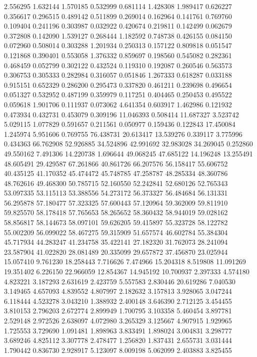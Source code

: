 2.556295
1.632144
1.570185
0.532999
0.681114
1.428308
1.989417
0.626227
0.356617
0.296515
0.489142
0.511899
0.269014
0.162964
0.141761
0.769760
0.109404
0.241196
0.303987
0.032922
0.420674
0.219811
0.142499
0.062679
0.372808
0.142090
1.539127
0.268444
1.182592
0.748738
0.426155
0.084150
0.072960
0.508014
0.303288
1.201934
0.250313
0.157122
0.809818
0.051547
0.121868
0.390401
0.553058
1.376332
0.859697
0.198560
0.545082
0.282361
0.468459
0.052799
0.302122
0.432524
0.119310
0.192087
0.260546
0.563573
0.306753
0.305333
0.282984
0.316057
0.051846
1.267333
0.618287
0.033188
0.915151
0.652329
0.286200
0.295473
0.337820
0.461211
0.239698
0.496654
0.051327
0.532952
0.487199
0.359979
0.117251
0.404465
0.250453
0.495522
0.059618
1.901706
0.111937
0.073062
4.641354
0.603917
1.462986
0.121932
0.473934
0.432731
0.453079
0.309196
11.046393
0.508414
11.687327
3.523742
5.029115
1.077829
0.591657
0.211561
0.050977
0.159436
0.122843
17.450084
1.245974
5.951606
0.769755
76.438731
20.613417
13.539276
0.339117
3.775996
0.434363
66.762908
52.926885
34.524896
42.991692
32.983028
34.269045
0.252860
49.550162
7.491306
14.220738
1.696644
49.068245
47.685122
14.196248
13.255491
48.605491
29.429587
67.261866
40.861726
66.207576
56.158417
55.606752
40.435125
41.170352
45.474472
45.748785
47.258787
48.285334
48.360786
48.762616
49.468300
50.785715
52.160550
52.242841
52.680126
52.765343
53.097335
53.115113
53.388556
54.273172
56.373327
56.484684
56.131331
56.295878
57.180477
57.323325
57.600443
57.120964
59.362009
59.811910
59.825570
58.178418
57.765653
58.265652
58.360432
58.944019
59.028162
58.856817
58.144673
58.097101
59.626205
59.415897
55.323728
58.122782
55.002209
56.099022
58.467275
59.315909
51.657574
46.602784
55.384304
45.717934
44.283247
41.234758
35.422141
27.182320
31.762073
28.241094
23.587904
41.022820
28.081489
20.335099
29.657872
37.456870
23.025944
15.057410
9.761230
18.258443
7.716626
7.474966
15.204318
8.519808
11.091269
19.351402
6.226150
22.966059
12.854367
14.945192
10.700937
2.397333
4.574180
4.823221
3.187293
2.631619
2.423759
5.557583
2.830446
20.619286
7.040530
3.149465
4.657093
4.839552
4.807997
2.182632
3.157813
3.928065
3.047244
6.118444
4.523278
3.043210
1.388932
2.400148
3.646390
2.712125
3.454455
3.810153
2.796203
2.672774
2.899949
1.700795
3.103358
5.460454
3.897781
2.529148
2.972526
2.638097
4.072980
3.265329
3.125667
4.907915
1.929965
1.725553
3.729690
1.091481
1.898963
3.833491
1.898024
3.004831
3.298777
3.689246
4.825112
3.307778
2.478477
1.256820
1.837431
2.655731
3.031444
1.790442
0.836730
2.928917
5.123097
8.009198
5.062099
2.403883
3.825455
